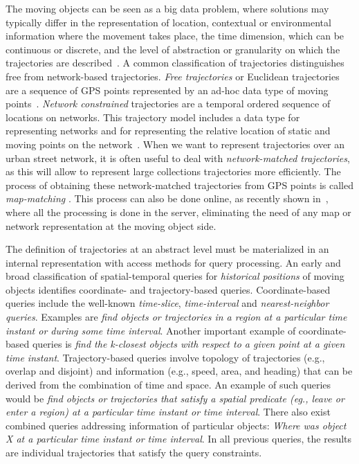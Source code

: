 \documentclass[a4paper,10pt,twoside]{book}
\begin{document}
    The moving objects can be seen as a big data problem, where solutions may typically differ in the representation of location, contextual or environmental information where the movement takes place, the time dimension, which can be continuous or discrete, and the level of abstraction or granularity on which the trajectories are described~\cite{DBLP:journals/sigspatial/DamianiIGV15}. A common classification of trajectories distinguishes free from network-based trajectories.  \textit{Free trajectories} or Euclidean trajectories are a sequence of GPS points represented by an ad-hoc data type of moving points~\cite{DBLP:conf/ssdbm/WolfsonXCJ98,DBLP:conf/icde/SistlaWCD97,DBLP:journals/tods/GutingBEJLSV00}. \textit{Network constrained} trajectories are a temporal ordered sequence of locations on networks. This trajectory model includes a data type for representing  networks and  for representing the relative location of static and moving  points on the network~\cite{DBLP:journals/vldb/GutingAD06}. When we want to represent trajectories over an urban street network, it is often useful to deal with \textit{network-matched trajectories}, as this will allow to represent large collections trajectories more efficiently. The process of obtaining these network-matched trajectories from GPS points is called \textit{map-matching} \cite{brakatsoulas2005map}. This process can also be done online, as recently shown in~\cite{DBLP:journals/tits/Ding0GL15}, where all the processing is done in the server, eliminating the need of any map or network representation at the moving object side.
    
    The definition of trajectories at an abstract level must be materialized in an internal representation with access methods for query processing. An early and broad classification of spatial-temporal queries for \textit{historical positions} of moving objects \cite{DBLP:conf/vldb/PfoserJT00} identifies coordinate- and trajectory-based queries. Coordinate-based queries include the well-known  {\it time-slice}, {\it time-interval} and \textit{nearest-neighbor queries}. Examples are \textit{find objects or trajectories in a region at a  particular time instant or during some time interval}. Another important example of coordinate-based queries is \textit{find the k-closest objects with respect to a given point at a given time instant}. Trajectory-based queries  involve topology of trajectories (e.g., overlap and disjoint) and information (e.g., speed, area, and heading) that can be derived from the combination of time and space. An example of such queries would be  \textit{find objects or trajectories that satisfy a spatial predicate (eg., leave or enter a region)  at a particular time instant or time interval}. There also exist combined queries addressing information of particular objects: \textit{Where was object X at a particular time instant or time interval}. In all previous queries, the results are individual trajectories that satisfy the query constraints.
    
\end{document}
